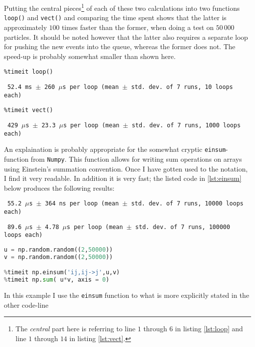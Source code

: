 Putting the central pieces\footnote{The \textit{central} part here is referring to line $1$ through $6$ in listing \ref{lst:loop} and line $1$ through $14$ in listing \ref{lst:vect}.} of each of these two calculations into two functions \texttt{loop()} and \texttt{vect()} and comparing the time spent shows that the latter is approximately $100$ times faster than the former, when doing a test on $50\,000$ particles. It should be noted however that the latter also requires a separate loop for pushing the new events into the queue, whereas the former does not. The speed-up is probably somewhat smaller than shown here.

\begin{lstlisting}
%timeit loop()
\end{lstlisting}
\texttt{\small
52.4 ms $\pm$ 260 $\mu$s per loop (mean $\pm$ std. dev. of 7 runs, 10 loops each)
}

\begin{lstlisting}
%timeit vect()
\end{lstlisting}
\texttt{\small
429 $\mu$s $\pm$ 23.3 $\mu$s per loop (mean $\pm$ std. dev. of 7 runs, 1000 loops each)
}


An explaination is probably appropriate for the somewhat cryptic \texttt{einsum}-function from \texttt{Numpy}. This function allows for writing sum operations on arrays using Einstein's summation convention. Once I have gotten used to the notation, I find it very readable. In addition it is very fast; the listed code in \ref{lst:einsum} below produces the following results: 

\texttt{\small
55.2 $\mu$s $\pm$ 364 ns per loop (mean $\pm$ std. dev. of 7 runs, 10000 loops each)
}

\texttt{\small 
89.6 $\mu$s $\pm$ 4.78 $\mu$s per loop (mean $\pm$ std. dev. of 7 runs, 100000 loops each)
}
\begin{lstlisting}[language=Python,label={lst:einsum}]
u = np.random.random((2,50000))
v = np.random.random((2,50000))

%timeit np.einsum('ij,ij->j',u,v)
%timeit np.sum( u*v, axis = 0)
\end{lstlisting}

In this example I use the \texttt{einsum} function to what is more explicitly stated in the other code-line